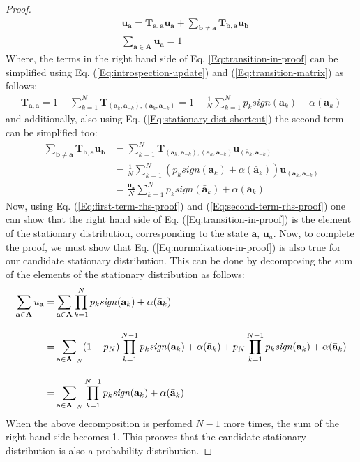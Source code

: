 \documentclass[11pt]{article}
\theoremstyle{plainCl1}
\theoremstyle{plainCl2}
\newcommand{\A}{\mathbf{A}}
\newcommand{\abf}{\mathbf{a}}
\newcommand{\bbf}{\mathbf{b}}
\newcommand{\T}{\mathbf{T}}
\newcommand{\ubf}{\mathbf{u}}
\begin{document}
\begin{proof}
\begin{align}
\label{Eq:transition-in-proof}
&\ubf_\abf = \T_{\abf,\abf} \ubf_\abf  + \sum_{\bbf \neq \abf} \T_{\bbf, \abf} \ubf_{\bbf}  \\[10pt] 
\label{Eq:normalization-in-proof}
&\sum_{\abf \in \A} \ubf_{\abf}= 1
\end{align}
Where, the terms in the right hand side of Eq. \ref{Eq:transition-in-proof} can be simplified using Eq. (\ref{Eq:introspection-update}) and (\ref{Eq:transition-matrix}) as follows:
\begin{eqnarray}
\T_{\abf,\abf} = 1 - \sum_{k=1}^{N} \T_{(\abf_k, \abf_{-k}), (\bar{\abf}_k,\abf_{-k})} = 1 - \frac{1}{N} \sum_{k=1}^{N} p_k \textit{sign}(\bar{\abf}_k) + \alpha(\abf_k)
\label{Eq:first-term-rhs-proof}
\end{eqnarray} 
and additionally, also using Eq. (\ref{Eq:stationary-dist-shortcut}) the second term can be simplified too:
\begin{align}
\sum_{\bbf \neq \abf} \T_{\bbf, \abf} \ubf_{\bbf} &= \sum_{k = 1}^N \T_{(\bar{\abf}_k,\abf_{-k}), (\abf_k, \abf_{-k})} \ubf_{(\bar{\abf}_k,\abf_{-k})} \\[10pt]
&= \frac{1}{N} \sum_{k = 1}^N \left(p_k \textit{sign}(\abf_k) +\alpha(\bar{\abf}_k) \right) \ubf_{(\bar{\abf}_k,\abf_{-k})} \\[10pt] 
\label{Eq:second-term-rhs-proof}
&= \frac{\ubf_\abf}{N} \sum_{k=1}^{N} p_k \textit{sign}(\bar{\abf}_k) + \alpha(\abf_k) 
\end{align}
Now, using Eq. (\ref{Eq:first-term-rhs-proof}) and (\ref{Eq:second-term-rhs-proof}) one can show that the right hand side of Eq. (\ref{Eq:transition-in-proof}) is the element of the stationary distribution, corresponding to the state $\abf$, $\ubf_a$.  Now, to complete the proof, we must show that Eq. (\ref{Eq:normalization-in-proof}) is also true for our candidate stationary distribution. This can be done by decomposing the sum of the elements of the stationary distribution as follows:
\begin{align}
\sum_{\abf \in \A} u_{\abf} =& \displaystyle \sum_{\abf \in \A} \prod_{k=1}^N p_k \mathit{sign}(\abf_k) + \alpha(\bar{\abf}_k) \\[10pt]
=& \displaystyle \displaystyle \sum_{\abf \in \A_{-\!N}} (1-p_N)  \prod_{k=1}^{N-1} p_k \mathit{sign}(\abf_k) + \alpha(\bar{\abf}_k)  + p_N  \prod_{k=1}^{N-1} p_k \mathit{sign}(\abf_k) + \alpha(\bar{\abf}_k) \\[10pt]
=& \displaystyle \sum_{\abf \in \A_{-\!N}} \prod_{k=1}^{N-1} p_k \mathit{sign}(\abf_k) + \alpha(\bar{\abf}_k)
\end{align}
When the above decomposition is perfomed $N-1$ more times, the sum of the right hand side becomes 1. This prooves that the candidate stationary distribution is also a probability distribution.
\end{proof}
\end{document}
